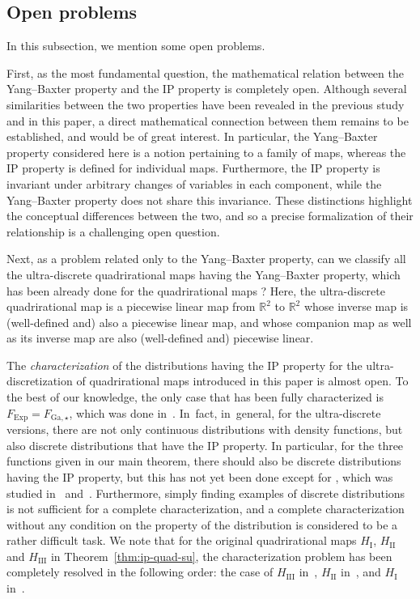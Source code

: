 \documentclass[pdftex]{sigma}
\numberwithin{equation}{section}
\def\R{\mathbb{R}}
\def\a{{\alpha}}
\def\b{{\beta}}
\begin{document}
\subsection{Open problems}

In this subsection, we mention some open problems.

First, as the most fundamental question, the mathematical relation between the Yang--Baxter property and the IP property is completely open. Although several similarities between the two properties have been revealed in the previous study~\cite{SU} and in this paper, a direct mathematical connection between them remains to be established, and would be of great interest. In particular, the Yang--Baxter property considered here is a notion pertaining to a family of maps, whereas the IP property is defined for individual maps. Furthermore, the IP property is invariant under arbitrary changes of variables in each component, while the Yang--Baxter property does not share this invariance. These distinctions highlight the conceptual differences between the two, and so a precise formalization of their relationship is a challenging open question.

Next, as a problem related only to the Yang--Baxter property, can we classify all the ultra-discrete quadrirational maps having the Yang--Baxter property, which has been already done for the quadrirational maps \cite{PSTV}? Here, the ultra-discrete quadrirational map is a piecewise linear map from $\R^2$ to $\R^2$ whose inverse map is (well-defined and) also a piecewise linear map, and whose companion map as well as its inverse map are also (well-defined and) piecewise linear.

The \textit{characterization} of the distributions having the IP property for the ultra-discretization of quadrirational maps introduced in this paper is almost open. To the best of our knowledge, the only case that has been fully characterized is $F_{\mathrm{Exp}}=F_{\mathrm{Ga},\star}$, which was done in~\cite{Cr}. In~fact, in~general, for the ultra-discrete versions, there are not only continuous distributions with density functions, but also discrete distributions that have the IP property. In particular, for the three functions given in our main theorem, there should also be discrete distributions having the IP property, but this has not yet been done except for \smash{$H^{B,\a,\b}_{\mathrm{III},\star}$}, which was studied in~\cite{CSirf} and~\cite{CS}. Furthermore, simply finding examples of discrete distributions is not sufficient for a complete characterization, and a complete characterization without any condition on the property of the distribution is considered to be a rather difficult task. We note that for the original quadrirational maps $H_{\mathrm{I}}$, $H_{\mathrm{II}}$ and $H_{\mathrm{III}}$ in Theorem~\ref{thm:ip-quad-su}, the characterization problem has been completely resolved in the following order: the case of $H_{\mathrm{III}}$ in~\cite{LW2}, $H_{\mathrm{II}}$ in~\cite{KW2}, and $H_{\mathrm{I}}$ in~\cite{KLPW2025}.
\end{document}

